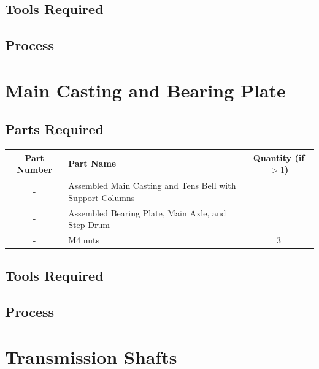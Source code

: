 \documentclass{article}
\begin{document}
\subsection{Tools Required}

\subsection{Process}



\newpage
\section{Main Casting and Bearing Plate}
\subsection{Parts Required}
\begin{table}[h!]
	\centering
	\begin{tabular}{clc}
		Part Number & Part Name & Quantity (if $>1$) \\ \hline
		- & Assembled Main Casting and Tens Bell with Support Columns & \\
		- & Assembled Bearing Plate, Main Axle, and Step Drum & \\ \hline \hline
		- & M4 nuts & 3
	\end{tabular}
\end{table}



\subsection{Tools Required}

\subsection{Process}


\newpage
\section{Transmission Shafts}
\end{document}
